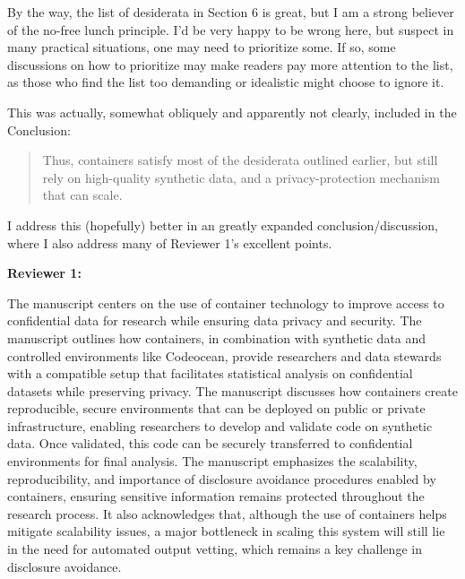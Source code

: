 \begin{referee}
By the way, the list of desiderata in
Section 6 is great,
but I am a strong believer of the no-free lunch principle. I'd be very happy to be wrong here, but
suspect in many practical situations, one may need to prioritize some. If so, some discussions on how
to prioritize may make readers pay more attention to the list, as those who find the list too
demanding or idealistic might choose to ignore it.

\end{referee}

\begin{response}
    This was actually, somewhat obliquely and apparently not clearly, included in the Conclusion:

    \begin{quote}
        Thus, containers satisfy most of the desiderata outlined earlier, but still rely on high-quality synthetic data, and a privacy-protection mechanism that can scale.
    \end{quote}
    
    
    \noindent I address this (hopefully) better in an greatly expanded conclusion/discussion, where I also address many of Reviewer 1's excellent points.


\end{response}

\newpage
\textbf{Reviewer 1:}

\begin{referee}
    
The manuscript centers on the use of container technology to improve access to confidential data for research while ensuring data privacy and security.  The manuscript outlines how containers, in combination with synthetic data and controlled environments like Codeocean, provide researchers and data stewards with a compatible setup that facilitates statistical analysis on confidential datasets while preserving privacy.  The manuscript discusses how containers create reproducible, secure environments that can be deployed on public or private infrastructure, enabling researchers to develop and validate code on synthetic data.  Once validated, this code can be securely transferred to confidential environments for final analysis.  The manuscript emphasizes the scalability, reproducibility, and importance of disclosure avoidance procedures enabled by containers, ensuring sensitive information remains protected throughout the research process.  It also acknowledges that, although the use of containers helps mitigate scalability issues, a major bottleneck in scaling this system will still lie in the need for automated output vetting, which remains a key challenge in disclosure avoidance.
\end{referee}

